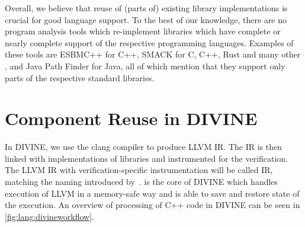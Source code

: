 Overall, we believe that reuse of (parts of) existing library implementations is crucial for good language support.
To the best of our knowledge, there are no program analysis tools which re-implement libraries which have complete or nearly complete support of the
respective programming languages.
Examples of these tools are ESBMC++  for C++, SMACK for C, C++, Rust and many other , and Java Path Finder  for Java, all of which mention that they support only parts of the respective standard libraries.

\section{Component Reuse in DIVINE}\label{sec:lang:divine}

In DIVINE, we use the clang compiler to produce LLVM IR.
The IR is then linked with implementations of libraries and instrumented for the verification.
The LLVM IR with verification-specific instrumentation will be called \divm IR,
matching the naming introduced by~.
\divm is the core of DIVINE which handles execution of LLVM in a memory-safe
way and is able to save and restore state of the execution.
An overview of processing of C++ code in DIVINE can be seen in \autoref{fig:lang:divineworkflow}.

